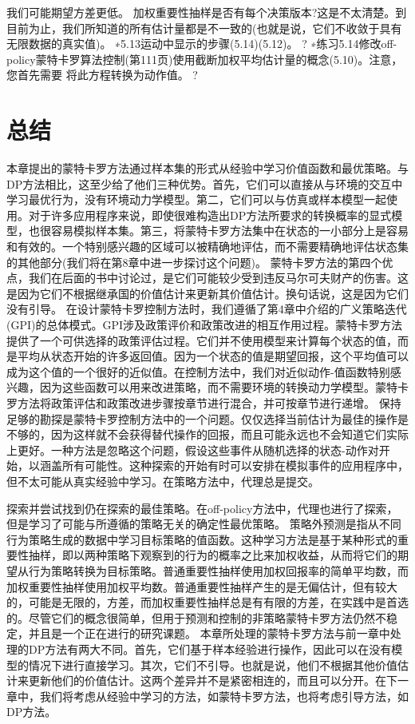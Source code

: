 我们可能期望方差更低。
加权重要性抽样是否有每个决策版本?这是不太清楚。到目前为止，我们所知道的所有估计量都是不一致的(也就是说，它们不收敛于具有无限数据的真实值)。
∗5.13运动中显示的步骤(5.14)(5.12)。 					?
∗练习5.14修改off-policy蒙特卡罗算法控制(第111页)使用截断加权平均估计量的概念(5.10)。注意，您首先需要
将此方程转换为动作值。 					?


\section{总结}

本章提出的蒙特卡罗方法通过样本集的形式从经验中学习价值函数和最优策略。与DP方法相比，这至少给了他们三种优势。首先，它们可以直接从与环境的交互中学习最优行为，没有环境动力学模型。第二，它们可以与仿真或样本模型一起使用。对于许多应用程序来说，即使很难构造出DP方法所要求的转换概率的显式模型，也很容易模拟样本集。第三，将蒙特卡罗方法集中在状态的一小部分上是容易和有效的。一个特别感兴趣的区域可以被精确地评估，而不需要精确地评估状态集的其他部分(我们将在第8章中进一步探讨这个问题)。
蒙特卡罗方法的第四个优点，我们在后面的书中讨论过，是它们可能较少受到违反马尔可夫财产的伤害。这是因为它们不根据继承国的价值估计来更新其价值估计。换句话说，这是因为它们没有引导。
在设计蒙特卡罗控制方法时，我们遵循了第4章中介绍的广义策略迭代(GPI)的总体模式。GPI涉及政策评价和政策改进的相互作用过程。蒙特卡罗方法提供了一个可供选择的政策评估过程。它们并不使用模型来计算每个状态的值，而是平均从状态开始的许多返回值。因为一个状态的值是期望回报，这个平均值可以成为这个值的一个很好的近似值。在控制方法中，我们对近似动作-值函数特别感兴趣，因为这些函数可以用来改进策略，而不需要环境的转换动力学模型。蒙特卡罗方法将政策评估和政策改进步骤按章节进行混合，并可按章节进行递增。
保持足够的勘探是蒙特卡罗控制方法中的一个问题。仅仅选择当前估计为最佳的操作是不够的，因为这样就不会获得替代操作的回报，而且可能永远也不会知道它们实际上更好。一种方法是忽略这个问题，假设这些事件从随机选择的状态-动作对开始，以涵盖所有可能性。这种探索的开始有时可以安排在模拟事件的应用程序中，但不太可能从真实经验中学习。在策略方法中，代理总是提交。

探索并尝试找到仍在探索的最佳策略。在off-policy方法中，代理也进行了探索，但是学习了可能与所遵循的策略无关的确定性最优策略。
策略外预测是指从不同行为策略生成的数据中学习目标策略的值函数。这种学习方法是基于某种形式的重要性抽样，即以两种策略下观察到的行为的概率之比来加权收益，从而将它们的期望从行为策略转换为目标策略。普通重要性抽样使用加权回报率的简单平均数，而加权重要性抽样使用加权平均数。普通重要性抽样产生的是无偏估计，但有较大的，可能是无限的，方差，而加权重要性抽样总是有有限的方差，在实践中是首选的。尽管它们的概念很简单，但用于预测和控制的非策略蒙特卡罗方法仍然不稳定，并且是一个正在进行的研究课题。
本章所处理的蒙特卡罗方法与前一章中处理的DP方法有两大不同。首先，它们基于样本经验进行操作，因此可以在没有模型的情况下进行直接学习。其次，它们不引导。也就是说，他们不根据其他价值估计来更新他们的价值估计。这两个差异并不是紧密相连的，而且可以分开。在下一章中，我们将考虑从经验中学习的方法，如蒙特卡罗方法，也将考虑引导方法，如DP方法。


